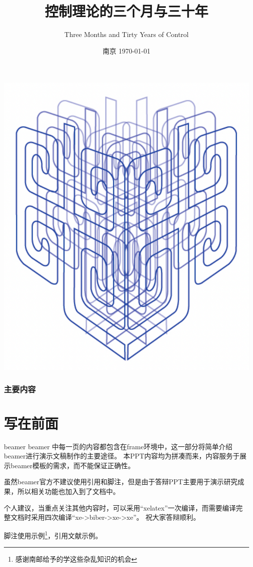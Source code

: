 \documentclass[10pt]{ctexbeamer}
\title[南京邮电大学]{控制理论的三个月与三十年}
\subtitle{Three Months and Tirty Years of Control}
\author[李倩茹]{}
\institute[自动化学院、人工智能学院]{}
\date[南京 \today]{南京 \today}
\begin{document}
\frame{\titlepage}
{
    \raggedright
    \includegraphics[trim=-680pt 0 0 -200pt,height=0.8\paperheight]{pic/njupt.pattern.pdf}
}
\begin{frame}
\frametitle{主要内容}
\tableofcontents
\end{frame}

\section{写在前面}

\begin{frame}{beamer}
  beamer 中每一页的内容都包含在frame环境中，这一部分将简单介绍beamer进行演示文稿制作的主要途径。
  本PPT内容均为拼凑而来，内容服务于展示beamer模板的需求，而不能保证正确性。

  虽然beamer官方不建议使用引用和脚注，但是由于答辩PPT主要用于演示研究成果，所以相关功能也加入到了文档中。

  个人建议，当重点关注其他内容时，可以采用“xelatex”一次编译，而需要编译完整文档时采用四次编译“xe->biber->xe->xe”。
  祝大家答辩顺利。

  脚注使用示例\footnote{感谢南邮给予的学这些杂乱知识的机会}，引用文献示例。
  
\end{frame}
\end{document}

